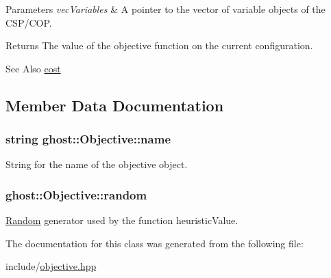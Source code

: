 \begin{DoxyParams}{Parameters}
{\em vec\-Variables} & A pointer to the vector of variable objects of the C\-S\-P/\-C\-O\-P. \\
\hline
\end{DoxyParams}
\begin{DoxyReturn}{Returns}
The value of the objective function on the current configuration. 
\end{DoxyReturn}
\begin{DoxySeeAlso}{See Also}
\hyperlink{classghost_1_1Objective_a85e094386db13d43e6d18275c4a14ea6}{cost} 
\end{DoxySeeAlso}


\subsection{Member Data Documentation}
\hypertarget{classghost_1_1Objective_af5bf0605c193884ad7f53593dabe8b85}{
\subsubsection[{name}]{\setlength{\rightskip}{0pt plus 5cm}string ghost\-::\-Objective\-::name\hspace{0.3cm}{\ttfamily [protected]}}}\label{classghost_1_1Objective_af5bf0605c193884ad7f53593dabe8b85}


String for the name of the objective object. 

\hypertarget{classghost_1_1Objective_a86081d1ebbab1fe6f781841d9ac8d546}{
\subsubsection[{random}]{ ghost\-::\-Objective\-::random\hspace{0.3cm}{\ttfamily [protected]}}}\label{classghost_1_1Objective_a86081d1ebbab1fe6f781841d9ac8d546}


\hyperlink{classghost_1_1Random}{Random} generator used by the function heuristic\-Value. 



The documentation for this class was generated from the following file\-:\begin{DoxyCompactItemize}
\item 
include/\hyperlink{objective_8hpp}{objective.\-hpp}\end{DoxyCompactItemize}

